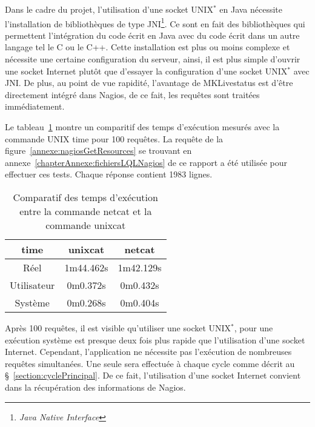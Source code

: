 Dans le cadre du projet, l'utilisation d'une socket UNIX$^*$ en Java n\'ecessite l'installation de biblioth\`eques de type JNI\protect\footnote{\textit{Java Native Interface}}.
Ce sont en fait des biblioth\`eques qui permettent l'int\'egration du code \'ecrit en Java avec du code \'ecrit dans un autre langage tel le C ou le C++.
Cette installation est plus ou moins complexe et n\'ecessite une certaine configuration du serveur, ainsi, il est plus simple d'ouvrir une socket Internet plut\^ot que d'essayer la configuration d'une socket UNIX$^*$ avec JNI.
De plus, au point de vue rapidit\'e, l'avantage de MKLivestatus est d'\^etre directement int\'egr\'e dans Nagios, de ce fait, les requ\^etes sont trait\'ees imm\'ediatement.

Le tableau~\ref{table:comparatifTemps} montre un comparitif des temps d'ex\'ecution mesur\'es avec la commande UNIX \textsf{time} pour 100 requ\^etes.
La requ\^ete de la figure~\ref{annexe:nagiosGetResources} se trouvant en annexe~\ref{chapterAnnexe:fichiersLQLNagios} de ce rapport a \'et\'e utilis\'ee pour effectuer ces tests.
Chaque r\'eponse contient 1983 lignes.

\begin{table}[!ht]
	\centering
	\begin{tabular}{|>{\columncolor{grisclair}}c|c|c|}
		\hline
		\rowcolor{grisclair} \textbf{time} & \textbf{unixcat} & \textbf{netcat}\\
		\hline
		R\'eel & 1m44.462s & 1m42.129s\\
		\hline
		Utilisateur & 0m0.372s & 0m0.432s\\
		\hline
		Syst\`eme & 0m0.268s & 0m0.404s\\
		\hline

	\end{tabular}

	\caption{Comparatif des temps d'ex\'ecution entre la commande \textsf{netcat} et la commande \textsf{unixcat}}
	\label{table:comparatifTemps}

\end{table}

Apr\`es 100 requ\^etes, il est visible qu'utiliser une socket UNIX$^*$, pour une ex\'ecution syst\`eme est presque deux fois plus rapide que l'utilisation d'une socket Internet.
Cependant, l'application ne n\'ecessite pas l'ex\'ecution de nombreuses requ\^etes simultan\'ees.
Une seule sera effectu\'ee \`a chaque cycle comme d\'ecrit au \S~\ref{section:cyclePrincipal}.
De ce fait, l'utilisation d'une socket Internet convient dans la r\'ecup\'eration des informations de Nagios.

